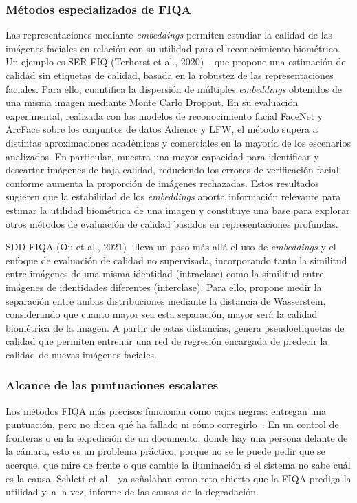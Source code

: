 \subsubsection{Métodos especializados de FIQA}
Las representaciones mediante \textit{embeddings} permiten estudiar la calidad de las imágenes faciales en relación con su utilidad para el reconocimiento biométrico. Un ejemplo es SER-FIQ (Terhorst et al., 2020)~\cite{Terhorst_2020_CVPR}, que propone una estimación de calidad sin etiquetas de calidad, basada en la robustez de las representaciones faciales. Para ello, cuantifica la dispersión de múltiples \textit{embeddings} obtenidos de una misma imagen mediante Monte Carlo Dropout. En su evaluación experimental, realizada con los modelos de reconocimiento facial FaceNet y ArcFace sobre los conjuntos de datos Adience y LFW, el método supera a distintas aproximaciones académicas y comerciales en la mayoría de los escenarios analizados. En particular, muestra una mayor capacidad para identificar y descartar imágenes de baja calidad, reduciendo los errores de verificación facial conforme aumenta la proporción de imágenes rechazadas. Estos resultados sugieren que la estabilidad de los \textit{embeddings} aporta información relevante para estimar la utilidad biométrica de una imagen y constituye una base para explorar otros métodos de evaluación de calidad basados en representaciones profundas.

SDD-FIQA (Ou et al., 2021)~\cite{Ou_2021_CVPR} lleva un paso más allá el uso de \textit{embeddings} y el enfoque de evaluación de calidad no supervisada, incorporando tanto la similitud entre imágenes de una misma identidad (intraclase) como la similitud entre imágenes de identidades diferentes (interclase). Para ello, propone medir la separación entre ambas distribuciones mediante la distancia de Wasserstein, considerando que cuanto mayor sea esta separación, mayor será la calidad biométrica de la imagen. A partir de estas distancias, genera pseudoetiquetas de calidad que permiten entrenar una red de regresión encargada de predecir la calidad de nuevas imágenes faciales.


\subsubsection{Alcance de las puntuaciones escalares}
Los métodos FIQA más precisos funcionan como cajas negras: entregan una puntuación, pero no dicen qué ha fallado ni cómo corregirlo~\cite{Saritas_2026_FG}. En un control de fronteras o en la expedición de un documento, donde hay una persona delante de la cámara, esto es un problema práctico, porque no se le puede pedir que se acerque, que mire de frente o que cambie la iluminación si el sistema no sabe cuál es la causa. Schlett et al.~\cite{Schlett_2022_CSUR} ya señalaban como reto abierto que la FIQA prediga la utilidad y, a la vez, informe de las causas de la degradación.

